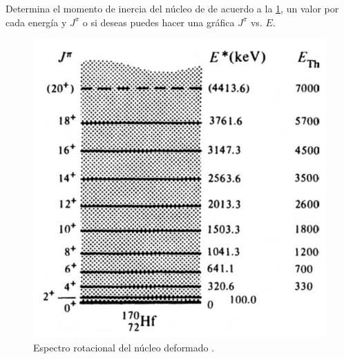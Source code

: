 \documentclass[./../main.tex]{subfiles}
\begin{document}
	\begin{exercise}
		Determina el momento de inercia del núcleo de  de acuerdo a la \cref{fig:hafmio-rot-spectrum}, un valor por cada energía y \(J^{\pi}\) o si deseas puedes hacer una gráfica \(J^{\pi}\) vs. \(E\).

		\begin{figure}[htb]
			\centering
			\includegraphics[scale=0.4]{rot_spectrum}
			\caption{Espectro rotacional del núcleo deformado .}			
			\label{fig:hafmio-rot-spectrum}
		\end{figure}
	\end{exercise}
\end{document}

